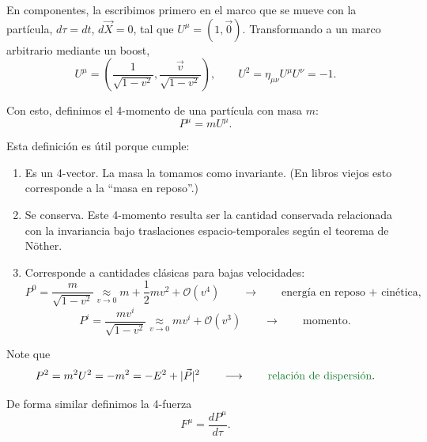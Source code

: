 \documentclass[11pt,a4paper]{article}
\newcommand{\concept}[1]{\textcolor{concept-green}{#1}}
\begin{document}
En componentes, la escribimos primero en el marco que se mueve con la partícula, $d\tau=dt$, $d\vec X=0$, tal que $U^\mu=(1,\vec 0)$. Transformando a un marco arbitrario mediante un boost,
\[
  U^\mu=
  \left(
    \frac{1}{\sqrt{1-v^2}},
    \frac{\vec v}{\sqrt{1-v^2}}
  \right),
  \qquad
  U^2=\eta_{\mu\nu}U^\mu U^\nu=-1.
\]

Con esto, definimos el \concept{4-momento} de una partícula con masa $m$:
\[
  P^\mu=mU^\mu.
\]

Esta definición es útil porque cumple:
\begin{enumerate}
  \item Es un 4-vector. La masa la tomamos como invariante. (En libros viejos esto corresponde a la ``masa en reposo''.)

  \item Se conserva. Este 4-momento resulta ser la cantidad conservada relacionada con la invariancia bajo traslaciones espacio-temporales según el teorema de Nöther.

  \item Corresponde a cantidades clásicas para bajas velocidades:
  \[
    P^0=\frac{m}{\sqrt{1-v^2}}
    \underset{v\to0}{\approx}
    m+\frac12mv^2+\mathcal O(v^4)
    \qquad\longrightarrow\qquad
    \text{energía en reposo + cinética},
  \]
  \[
    P^i=\frac{mv^i}{\sqrt{1-v^2}}
    \underset{v\to0}{\approx}
    mv^i+\mathcal O(v^3)
    \qquad\longrightarrow\qquad
    \text{momento}.
  \]
\end{enumerate}

Note que
\[
  P^2=m^2U^2=-m^2=-E^2+|\vec P|^2
  \qquad\longrightarrow\qquad
  \concept{\text{relación de dispersión}}.
\]

De forma similar definimos la 4-fuerza
\[
  F^\mu=\frac{dP^\mu}{d\tau}.
\]
\end{document}
